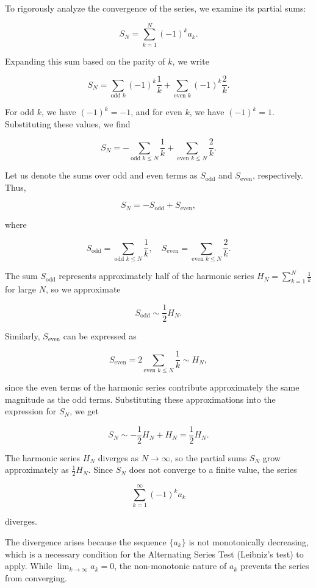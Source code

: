 \documentclass[12pt]{article}
\begin{document}
\begin{enumerate}
To rigorously analyze the convergence of the series, we examine its partial sums:

\[
S_N = \sum_{k=1}^N (-1)^k a_k.
\]

Expanding this sum based on the parity of \(k\), we write

\[
S_N = \sum_{\text{odd } k} (-1)^k \frac{1}{k} + \sum_{\text{even } k} (-1)^k \frac{2}{k}.
\]

For odd \(k\), we have \((-1)^k = -1\), and for even \(k\), we have \((-1)^k = 1\). Substituting these values, we find

\[
S_N = -\sum_{\text{odd } k \leq N} \frac{1}{k} + \sum_{\text{even } k \leq N} \frac{2}{k}.
\]

Let us denote the sums over odd and even terms as \(S_{\text{odd}}\) and \(S_{\text{even}}\), respectively. Thus,

\[
S_N = -S_{\text{odd}} + S_{\text{even}},
\]

where

\[
S_{\text{odd}} = \sum_{\text{odd } k \leq N} \frac{1}{k}, \quad S_{\text{even}} = \sum_{\text{even } k \leq N} \frac{2}{k}.
\]

The sum \(S_{\text{odd}}\) represents approximately half of the harmonic series \(H_N = \sum_{k=1}^N \frac{1}{k}\) for large \(N\), so we approximate

\[
S_{\text{odd}} \sim \frac{1}{2} H_N.
\]

Similarly, \(S_{\text{even}}\) can be expressed as

\[
S_{\text{even}} = 2 \sum_{\text{even } k \leq N} \frac{1}{k} \sim H_N,
\]

since the even terms of the harmonic series contribute approximately the same magnitude as the odd terms. Substituting these approximations into the expression for \(S_N\), we get

\[
S_N \sim -\frac{1}{2} H_N + H_N = \frac{1}{2} H_N.
\]

The harmonic series \(H_N\) diverges as \(N \to \infty\), so the partial sums \(S_N\) grow approximately as \(\frac{1}{2} H_N\). Since \(S_N\) does not converge to a finite value, the series

\[
\sum_{k=1}^\infty (-1)^k a_k
\]

diverges.

The divergence arises because the sequence \(\{a_k\}\) is not monotonically decreasing, which is a necessary condition for the Alternating Series Test (Leibniz's test) to apply. While \(\lim_{k \to \infty} a_k = 0\), the non-monotonic nature of \(a_k\) prevents the series from converging.

\end{enumerate}
\end{document}
